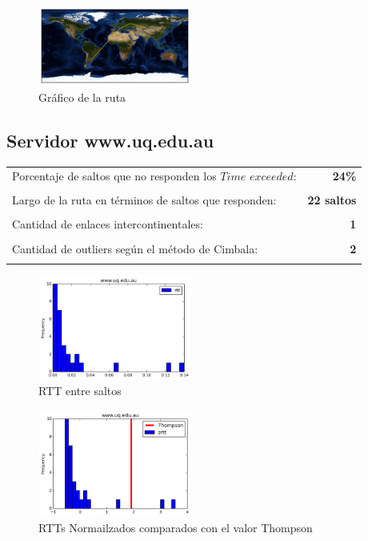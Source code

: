 \begin{figure}[H]
  \centering
    \includegraphics[width=0.45\textwidth]{grafico-rutas/www-kstu-kz.png}
  \caption{Gráfico de la ruta}
  \label{entropia-s}
\end{figure}




\subsection{Servidor www.uq.edu.au}

\begin{center}
\begin{tabular}{p{6.5cm}r}
Porcentaje de saltos que no responden los $Time$ $exceeded$: & \textbf{24\%} \\ \\ 
Largo de la ruta en términos de saltos que responden: &\textbf{22 saltos} \\ \\
Cantidad de enlaces intercontinentales: & \textbf{1} \\ \\
Cantidad de outliers según el método de Cimbala: & \textbf{2} \\ \\
\end{tabular}
\end{center}



\begin{figure}[H]
  \centering
    \includegraphics[width=0.45\textwidth]{histogramas_rtt/www-uq-edu-au.png}
  \caption{RTT entre saltos}
  \label{entropia-s}
\end{figure}

\begin{figure}[H]
  \centering
    \includegraphics[width=0.45\textwidth]{histogramas_thompson/www-uq-edu-au.png}
  \caption{RTTs Normailzados comparados con el valor Thompson}
  \label{entropia-s}
\end{figure}

